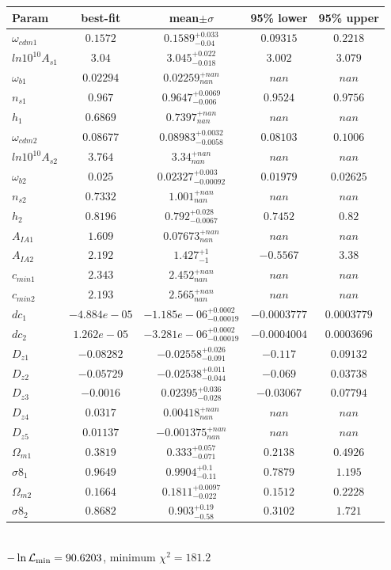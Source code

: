 \begin{tabular}{|l|c|c|c|c|} 
 \hline 
Param & best-fit & mean$\pm\sigma$ & 95\% lower & 95\% upper \\ \hline 
$\omega_{cdm 1 }$ &$0.1572$ & $0.1589_{-0.04}^{+0.033}$ & $0.09315$ & $0.2218$ \\ 
$ln10^{10}A_{s 1 }$ &$3.04$ & $3.045_{-0.018}^{+0.022}$ & $3.002$ & $3.079$ \\ 
$\omega_{b 1 }$ &$0.02294$ & $0.02259_{nan}^{+nan}$ & $nan$ & $nan$ \\ 
$n_{s 1 }$ &$0.967$ & $0.9647_{-0.006}^{+0.0069}$ & $0.9524$ & $0.9756$ \\ 
$h_{1 }$ &$0.6869$ & $0.7397_{nan}^{+nan}$ & $nan$ & $nan$ \\ 
$\omega_{cdm 2 }$ &$0.08677$ & $0.08983_{-0.0058}^{+0.0032}$ & $0.08103$ & $0.1006$ \\ 
$ln10^{10}A_{s 2 }$ &$3.764$ & $3.34_{nan}^{+nan}$ & $nan$ & $nan$ \\ 
$\omega_{b 2 }$ &$0.025$ & $0.02327_{-0.00092}^{+0.003}$ & $0.01979$ & $0.02625$ \\ 
$n_{s 2 }$ &$0.7332$ & $1.001_{nan}^{+nan}$ & $nan$ & $nan$ \\ 
$h_{2 }$ &$0.8196$ & $0.792_{-0.0067}^{+0.028}$ & $0.7452$ & $0.82$ \\ 
$A_{IA 1 }$ &$1.609$ & $0.07673_{nan}^{+nan}$ & $nan$ & $nan$ \\ 
$A_{IA 2 }$ &$2.192$ & $1.427_{-1}^{+1}$ & $-0.5567$ & $3.38$ \\ 
$c_{min 1 }$ &$2.343$ & $2.452_{nan}^{+nan}$ & $nan$ & $nan$ \\ 
$c_{min 2 }$ &$2.193$ & $2.565_{nan}^{+nan}$ & $nan$ & $nan$ \\ 
$dc_{1 }$ &$-4.884e-05$ & $-1.185e-06_{-0.00019}^{+0.0002}$ & $-0.0003777$ & $0.0003779$ \\ 
$dc_{2 }$ &$1.262e-05$ & $-3.281e-06_{-0.00019}^{+0.0002}$ & $-0.0004004$ & $0.0003696$ \\ 
$D_{z1 }$ &$-0.08282$ & $-0.02558_{-0.091}^{+0.026}$ & $-0.117$ & $0.09132$ \\ 
$D_{z2 }$ &$-0.05729$ & $-0.02538_{-0.044}^{+0.011}$ & $-0.069$ & $0.03738$ \\ 
$D_{z3 }$ &$-0.0016$ & $0.02395_{-0.028}^{+0.036}$ & $-0.03067$ & $0.07794$ \\ 
$D_{z4 }$ &$0.0317$ & $0.00418_{nan}^{+nan}$ & $nan$ & $nan$ \\ 
$D_{z5 }$ &$0.01137$ & $-0.001375_{nan}^{+nan}$ & $nan$ & $nan$ \\ 
$\Omega_{m 1 }$ &$0.3819$ & $0.333_{-0.071}^{+0.057}$ & $0.2138$ & $0.4926$ \\ 
$\sigma8_{1 }$ &$0.9649$ & $0.9904_{-0.11}^{+0.1}$ & $0.7879$ & $1.195$ \\ 
$\Omega_{m 2 }$ &$0.1664$ & $0.1811_{-0.022}^{+0.0097}$ & $0.1512$ & $0.2228$ \\ 
$\sigma8_{2 }$ &$0.8682$ & $0.903_{-0.58}^{+0.19}$ & $0.3102$ & $1.721$ \\ 
\hline 
 \end{tabular} \\ 
$-\ln{\cal L}_\mathrm{min} =90.6203$, minimum $\chi^2=181.2$ \\ 
